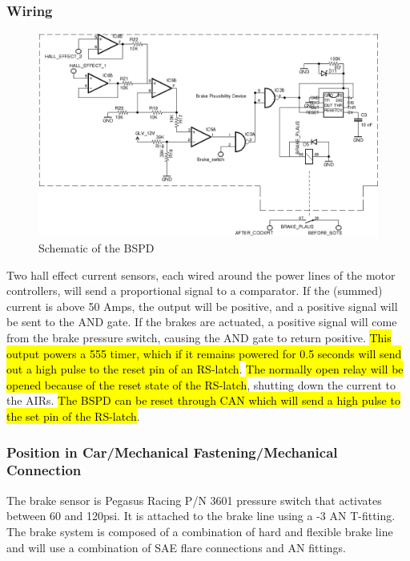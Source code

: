 \documentclass{article}
\DeclareRobustCommand{\hlr}[1]{{\sethlcolor{red}\hl{#1}}}
\begin{document}
        \subsubsection{Wiring}

            \begin{figure}[H]
                \centering
                \includegraphics[width = 0.9 \textwidth]{BSPD}
                \caption{Schematic of the BSPD}
                \label{BSPDschem}
            \end{figure}

Two hall effect current sensors, each wired around the power lines of the motor controllers, will send a proportional signal to a comparator. If the (summed) current is above 50 Amps, the output will be positive, and a positive signal will be sent to the AND gate. If the brakes are actuated, a positive signal will come from the brake pressure switch, causing the AND gate to return positive. \hlr{This output powers a 555 timer, which if it remains powered for 0.5 seconds will send out a high pulse to the reset pin of an RS-latch}. \hlr{The normally open relay will be opened because of the reset state of the RS-latch}, shutting down the current to the AIRs. \hlr{The BSPD can be reset through CAN which will send a high pulse to the set pin of the RS-latch}.




        \subsubsection{Position in Car/Mechanical Fastening/Mechanical Connection}
 The brake sensor is Pegasus Racing P/N 3601 pressure switch that activates between 60 and 120psi. It is attached to the brake line using a -3 AN T-fitting. The brake system is composed of a combination of hard and flexible brake line and will use a combination of SAE flare connections and AN fittings.
\end{document}

